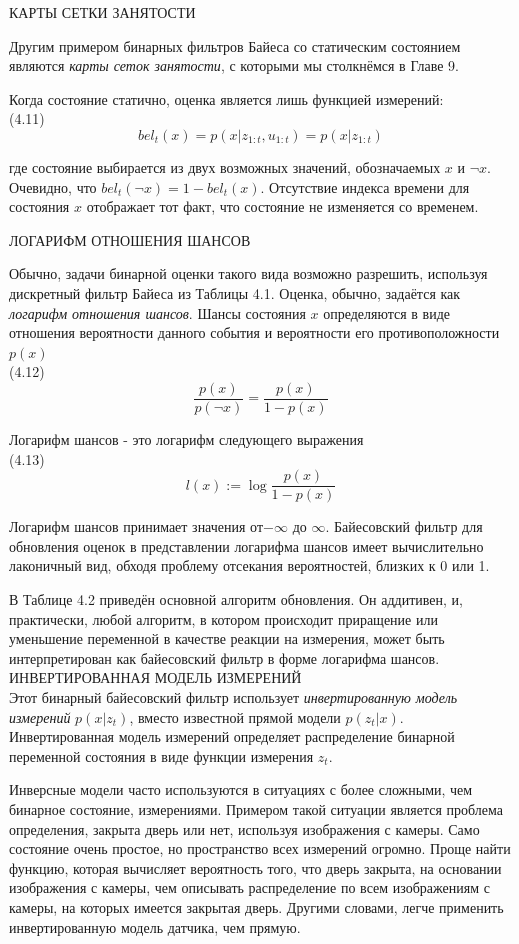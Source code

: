 \documentclass[10pt,a4paper]{article}
\begin{document}
КАРТЫ СЕТКИ ЗАНЯТОСТИ

Другим примером бинарных фильтров Байеса со статическим состоянием являются \textit{карты сеток занятости}, с которыми мы столкнёмся в Главе 9.

Когда состояние статично, оценка является лишь функцией измерений:\\
 
(4.11)
$$bel_t(x)=p(x|z_{1:t},u_{1:t})=p(x|z_{1:t})$$

где состояние выбирается из двух возможных значений, обозначаемых $x$ и $\neg x$. Очевидно, что $bel_t(\neg x) = 1 - bel_t(x)$. Отсутствие индекса времени для состояния $x$ отображает тот факт, что состояние не изменяется со временем.

ЛОГАРИФМ ОТНОШЕНИЯ ШАНСОВ

Обычно, задачи бинарной оценки такого вида  возможно разрешить, используя дискретный фильтр Байеса из Таблицы 4.1. Оценка, обычно, задаётся как 
\textit{логарифм отношения шансов}. Шансы состояния $x$ определяются в виде отношения вероятности данного события и вероятности его противоположности
$p(x)$\\

(4.12)
$$\frac{p(x)}{p(\neg x)} = \frac{p(x)}{1-p(x)}$$

Логарифм шансов - это логарифм следующего выражения\\

(4.13)
$$l(x):=\log\frac{p(x)}{1-p(x)}$$

Логарифм шансов принимает значения от$-\infty$ до $\infty$. Байесовский фильтр для обновления оценок в представлении логарифма шансов имеет вычислительно лаконичный вид, обходя проблему отсекания вероятностей, близких к 0 или 1.

В Таблице 4.2 приведён основной алгоритм обновления. Он аддитивен, и, практически, любой алгоритм, в котором происходит приращение или уменьшение переменной в качестве реакции на измерения, может быть интерпретирован как байесовский фильтр в форме логарифма шансов.\\ 
ИНВЕРТИРОВАННАЯ МОДЕЛЬ ИЗМЕРЕНИЙ\\
Этот бинарный байесовский фильтр использует \textit{инвертированную модель измерений} $p(x | z_t)$, вместо известной прямой модели $p(z_t | x)$. Инвертированная модель измерений определяет распределение  бинарной переменной состояния в виде функции измерения $z_t$.

Инверсные модели часто используются в ситуациях с более сложными, чем бинарное состояние, измерениями. Примером такой ситуации является проблема определения, закрыта дверь или нет, используя изображения с камеры. Само состояние очень простое, но пространство всех измерений огромно. Проще найти функцию, которая вычисляет вероятность того, что дверь закрыта, на основании изображения с камеры, чем описывать распределение по всем изображениям с камеры, на которых имеется закрытая дверь. Другими словами, легче применить инвертированную модель датчика, чем прямую. 
\end{document}
